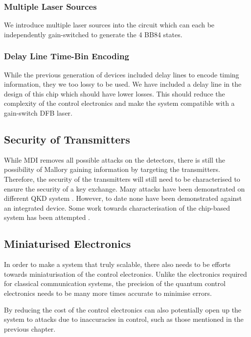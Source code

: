 \subsubsection*{Multiple Laser Sources}

We introduce multiple laser sources into the circuit which can each be independently gain-switched to generate the 4 BB84 states. 

\subsubsection*{Delay Line Time-Bin Encoding}

While the previous generation of devices included delay lines to encode timing information, they we too lossy to be used. We have included a delay line in the design of this chip which should have lower losses. This should reduce the complexity of the control electronics and make the system compatible with a gain-switch DFB laser.

\subsection{Security of Transmitters}

While \ac{MDI} removes all possible attacks on the detectors, there is still the possibility of Mallory gaining information by targeting the transmitters. Therefore, the security of the transmitters will still need to be characterised to ensure the security of a key exchange. Many attacks have been demonstrated on different \ac{QKD} system \cite{makarov2019}. However, to date none have been demonstrated against an integrated device. Some work towards characterisation of the chip-based system has been attempted \cite{vaquero2018}.

\subsection{Miniaturised Electronics}

In order to make a system that truly scalable, there also needs to be efforts towards miniaturisation of the control electronics. Unlike the electronics required for classical communication systems, the precision of the quantum control electronics needs to be many more times accurate to minimise errors.

By reducing the cost of the control electronics can also potentially open up the system to attacks due to inaccuracies in control, such as those mentioned in the previous chapter. 

